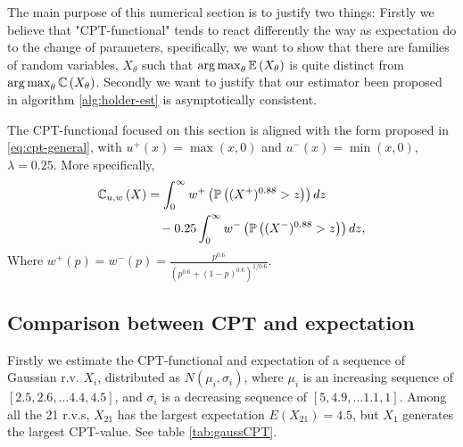 The main purpose of this numerical section is to justify two things: Firstly we believe that "CPT-functional" tends to react differently the way as expectation do to the change of parameters, specifically, we want to show that there are families of random variables, $X_\theta$ such that $\mathop{\rm arg\,max}_{\theta} \mathbb{E}\left( X_\theta \right)$ is quite distinct from 
$\mathop{\rm arg\,max}_{\theta} \mathbb{C} \left( X_\theta \right)$. Secondly we want to justify that our estimator been proposed in algorithm 
\ref{alg:holder-est} is asymptotically consistent.

The CPT-functional focused on this section is aligned with the form proposed in \eqref{eq:cpt-general}, with $u^+(x) = \max(x,0)$ and 
$u^-(x) = \min(x,0)$, $\lambda = 0.25$. 
More specifically,
\begin{align}
\mathbb{C}_{u,w}\left(X\right) &= \int_0^{\infty} w^+\left(\mathbb{P}\left( (X^+)^{0.88}>z \right)\right) dz\nonumber \\
&\quad - 0.25 \int_0^{\infty} w^-\left(\mathbb{P}\left( (X^-)^{0.88}>z \right)\right) dz \label{eq:CPT-numerical-section} , 
\end{align}
Where $w^+(p) = w^-(p) = \frac{p^{0.6}}{(p^{0.6} + (1-p)^{0.6})^{1/0.6}}.$ 



\subsection{Comparison between CPT and expectation}
Firstly we estimate the CPT-functional and expectation of a sequence of Gaussian r.v. $X_i$, distributed as $N(\mu_i, \sigma_i)$, where
$\mu_i$ is an increasing sequence of $[2.5, 2.6, \ldots 4.4, 4.5]$, and $\sigma_i$ is a decreasing sequence of $[5, 4.9, \ldots 1.1, 1]$.
Among all the 21 r.v.s, $X_{21}$ has the largest expectation $E(X_{21}) = 4.5$, but $X_1$ generates the largest CPT-value. See table
\ref{tab:gaussCPT}.


